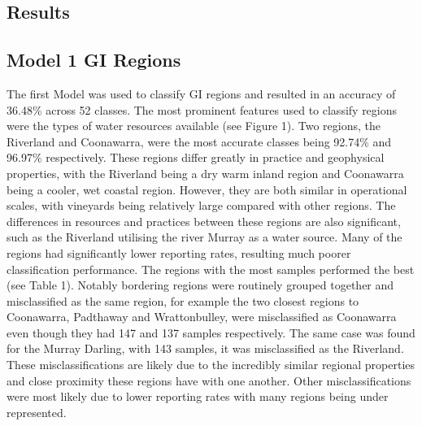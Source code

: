\documentclass[review,12pt,authoryear]{elsarticle}
\begin{document}
\begin{linenumbers}
\section{Results}

\subsection{Model 1 GI Regions}
The first Model was used to classify GI regions and resulted in an accuracy of 36.48\% across 52 classes. The most prominent features used to classify regions were the types of water resources available (see Figure 1). Two regions, the Riverland and Coonawarra, were the most accurate classes being 92.74\% and 96.97\% respectively. These regions differ greatly in practice and geophysical properties, with the Riverland being a dry warm inland region and Coonawarra being a cooler, wet coastal region. However, they are both similar in operational scales, with vineyards being relatively large compared with other regions. The differences in resources and practices between these regions are also significant, such as the Riverland utilising the river Murray as a water source. Many of the regions had significantly lower reporting rates, resulting much poorer classification performance. The regions with the most samples performed the best (see Table 1). Notably bordering regions were routinely grouped together and misclassified as the same region, for example the two closest regions to Coonawarra, Padthaway and Wrattonbulley, were misclassified as Coonawarra even though they had 147 and 137 samples respectively. The same case was found for the Murray Darling, with 143 samples, it was misclassified as the Riverland. These misclassifications are likely due to the incredibly similar regional properties and close proximity these regions have with one another. Other misclassifications were most likely due to lower reporting rates with many regions being under represented.

\begin{table}[]
    \caption{Classification accuracy of the most prominent GI Regions.}
    \label{tab:accuracy}
\end{table}


\end{linenumbers}
\end{document}
